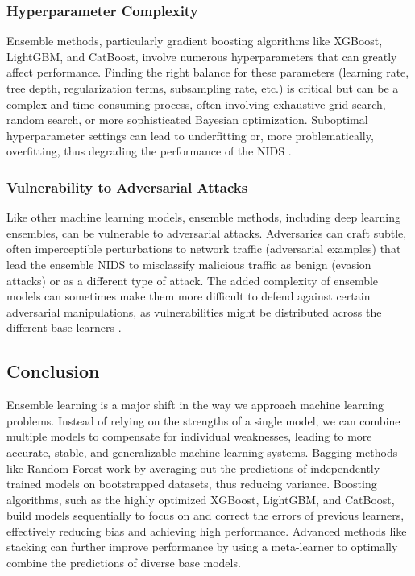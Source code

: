 \subsubsection{Hyperparameter Complexity} 
Ensemble methods, particularly gradient boosting algorithms like XGBoost, LightGBM, and CatBoost, involve numerous hyperparameters that can greatly affect performance. Finding the right balance for these parameters (learning rate, tree depth, regularization terms, subsampling rate, etc.) is critical but can be a complex and time-consuming process, often involving exhaustive grid search, random search, or more sophisticated Bayesian optimization. Suboptimal hyperparameter settings can lead to underfitting or, more problematically, overfitting, thus degrading the performance of the NIDS \parencite{habeeb2024two}.

\subsubsection{Vulnerability to Adversarial Attacks} 
Like other machine learning models, ensemble methods, including deep learning ensembles, can be vulnerable to adversarial attacks. Adversaries can craft subtle, often imperceptible perturbations to network traffic (adversarial examples) that lead the ensemble NIDS to misclassify malicious traffic as benign (evasion attacks) or as a different type of attack. The added complexity of ensemble models can sometimes make them more difficult to defend against certain adversarial manipulations, as vulnerabilities might be distributed across the different base learners \parencite{kim2021adversarial}.

\subsection{Conclusion} 
Ensemble learning is a major shift in the way we approach machine learning problems. Instead of relying on the strengths of a single model, we can combine multiple models to compensate for individual weaknesses, leading to more accurate, stable, and generalizable machine learning systems. Bagging methods like Random Forest work by averaging out the predictions of independently trained models on bootstrapped datasets, thus reducing variance. Boosting algorithms, such as the highly optimized XGBoost, LightGBM, and CatBoost, build models sequentially to focus on and correct the errors of previous learners, effectively reducing bias and achieving high performance. Advanced methods like stacking can further improve performance by using a meta-learner to optimally combine the predictions of diverse base models.

